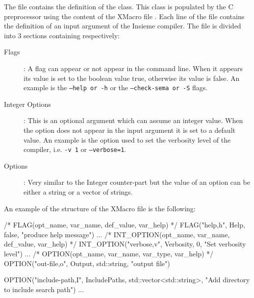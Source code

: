 The file  contains the definition of the
 class. This class is populated by the C preprocessor
using the content of the XMacro file . Each line of the
file contains the definition of an input argument of the Insieme compiler. The
file is divided into 3 sections containing respectively: 

\begin{description}
\item [Flags]: A flag can appear or not appear in the command line. When it
appears its value is set to the boolean value true, otherwise its value is
false. An example is the {\tt --help or -h} or the {\tt --check-sema or -S}
flags. 

\item [Integer Options]: This is an optional argument which can assume an
integer value. When the option does not appear in the input argument it is set
to a default value. An example is the option used to set the verbosity level of
the compiler, i.e. {\tt -v 1} or {\tt --verbose=1}. 

\item [Options]: Very similar to the Integer counter-part but the value of an
option can be either a string or a vector of strings.
\end{description}

An example of the structure of the  XMacro file is the
following:

\begin{insCode} 
/* FLAG(opt_name, var_name, def_value, var_help) */
FLAG("help,h",    Help,     false,     "produce help message")
...
/* INT_OPTION(opt_name, var_name, def_value, var_help) */
INT_OPTION("verbose,v", Verbosity, 0, "Set verbosity level")
...
/* OPTION(opt_name, var_name, var_type, var_help) */ 
OPTION("out-file,o", Output,  std::string, "output file")

OPTION("include-path,I", IncludePaths, std::vector<std::string>, 	
	   "Add directory to include search path")
...
\end{insCode}

